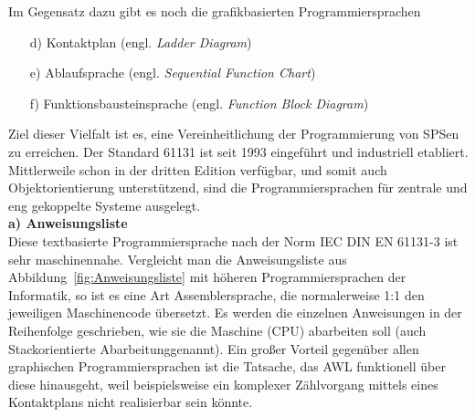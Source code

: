 	Im Gegensatz dazu gibt es noch die grafikbasierten Programmiersprachen
	
	\begin{itemize}
		\item[d)] Kontaktplan (engl. \textit{Ladder Diagram})
		\item[e)] Ablaufsprache (engl. \textit{Sequential Function Chart})
		\item[f)] Funktionsbausteinsprache (engl. \textit{Function Block Diagram})
	\end{itemize}
	
	Ziel dieser Vielfalt ist es, eine Vereinheitlichung der Programmierung von SPSen zu erreichen. Der Standard 61131 ist seit 1993 eingeführt und industriell etabliert. Mittlerweile schon in der dritten Edition verfügbar, und somit auch Objektorientierung unterstützend, sind die Programmiersprachen für zentrale und eng gekoppelte Systeme ausgelegt.\\
	
	\textbf{a) Anweisungsliste}\\
	
	Diese textbasierte Programmiersprache nach der Norm IEC DIN EN 61131-3 ist sehr maschinennahe. Vergleicht man die Anweisungsliste aus Abbildung~\ref{fig:Anweisungsliste} mit höheren Programmiersprachen der Informatik, so ist es eine Art Assemblersprache, die normalerweise 1:1 den jeweiligen Maschinencode übersetzt. Es werden die einzelnen Anweisungen in der Reihenfolge geschrieben, wie sie die Maschine (CPU) abarbeiten soll (auch \glqq Stackorientierte Abarbeitung\grqq \space genannt). Ein großer Vorteil gegenüber allen graphischen Programmiersprachen ist die Tatsache, das AWL funktionell über diese hinausgeht, weil beispielsweise ein komplexer Zählvorgang mittels eines Kontaktplans nicht realisierbar sein könnte.	\cite{spslehrgang_struktur, egroetsch_sps}\\

